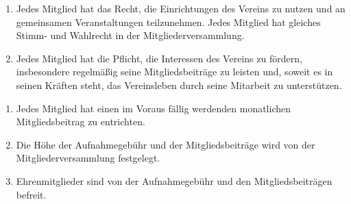 \documentclass{scrartcl}
\begin{document}
\begin{contract}
\Clause[title={Rechte und Pflichten der Mitglieder}]
\begin{enumerate}
    \item Jedes Mitglied hat das Recht, die Einrichtungen des Vereins zu nutzen und an gemeinsamen Veranstaltungen teilzunehmen.  Jedes Mitglied hat gleiches Stimm- und Wahlrecht in der Mitgliederversammlung.
    \item Jedes Mitglied hat die Pflicht, die Interessen des Vereins zu fördern, insbesondere regelmäßig seine Mitgliedsbeiträge zu leisten und, soweit es in seinen Kräften steht, das Vereinsleben durch seine Mitarbeit zu unterstützen.
\end{enumerate}

\Clause[title={Aufnahmegebühr und Mitgliedsbeiträge}]
\begin{enumerate}
    \item Jedes Mitglied hat einen im Voraus fällig werdenden monatlichen Mitgliedsbeitrag zu entrichten.
    \item Die Höhe der Aufnahmegebühr und der Mitgliedsbeiträge wird von der Mitgliederversammlung festgelegt.
    \item Ehrenmitglieder sind von der Aufnahmegebühr und den Mitgliedsbeiträgen befreit.
\end{enumerate}

\end{contract}
\end{document}
